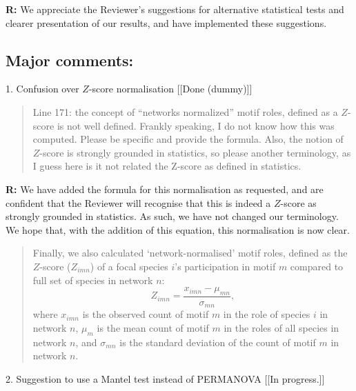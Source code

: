 \documentclass[12pt]{article}
\begin{document}
  \textbf{R:} We appreciate the Reviewer's suggestions for alternative statistical tests and clearer presentation of our results, and have implemented these suggestions.

  \smallskip

  \subsection*{Major comments:}

    1. Confusion over $Z$-score normalisation [[Done (dummy)]]

      \begin{quotation}
        Line 171: the concept of ``networks normalized'' motif roles, defined as a $Z$-score is not well defined. Frankly speaking, I do not know how this was computed. Please be specific and provide the formula. Also, the notion of $Z$-score is strongly grounded in statistics, so please another terminology, as I guess here is it not related the Z-score as defined in statistics.
      \end{quotation}

      \smallskip

      \textbf{R:} We have added the formula for this normalisation as requested, and are confident that the Reviewer will recognise that this is indeed a $Z$-score as strongly grounded in statistics. As such, we have not changed our terminology. We hope that, with the addition of this equation, this normalisation is now clear.

      \begin{quotation}
        Finally, we also calculated `network-normalised' motif roles, defined as the $Z$-score ($Z_{imn}$) of a focal species $i$'s participation in motif $m$ compared to full set of species in network $n$:
        \begin{equation}
                Z_{imn} = \frac{x_{imn}-\mu_{mn}}{\sigma_{mn}} ,
        \end{equation}
        where $x_{imn}$ is the observed count of motif $m$ in the role of species $i$ in network $n$, $\mu_m$ is the mean count of motif $m$ in the roles of all species in network $n$, and $\sigma_{mn}$ is the standard deviation of the count of motif $m$ in network $n$.
      \end{quotation}

    \smallskip

    2. Suggestion to use a Mantel test instead of PERMANOVA [[In progress.]]
\end{document}
